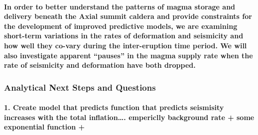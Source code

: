 \documentclass[11pt]{article}
\begin{document}
\hypertarget{in-order-to-better-understand-the-patterns-of-magma-storage-and-delivery-beneath-the-axial-summit-caldera-and-provide-constraints-for-the-development-of-improved-predictive-models-we-are-examining-short-term-variations-in-the-rates-of-deformation-and-seismicity-and-how-well-they-co-vary-during-the-inter-eruption-time-period.-we-will-also-investigate-apparent-pauses-in-the-magma-supply-rate-when-the-rate-of-seismicity-and-deformation-have-both-dropped.}{%
\paragraph{In order to better understand the patterns of magma storage
and delivery beneath the Axial summit caldera and provide constraints
for the development of improved predictive models, we are examining
short-term variations in the rates of deformation and seismicity and how
well they co-vary during the inter-eruption time period. We will also
investigate apparent ``pauses'' in the magma supply rate when the rate
of seismicity and deformation have both
dropped.}\label{in-order-to-better-understand-the-patterns-of-magma-storage-and-delivery-beneath-the-axial-summit-caldera-and-provide-constraints-for-the-development-of-improved-predictive-models-we-are-examining-short-term-variations-in-the-rates-of-deformation-and-seismicity-and-how-well-they-co-vary-during-the-inter-eruption-time-period.-we-will-also-investigate-apparent-pauses-in-the-magma-supply-rate-when-the-rate-of-seismicity-and-deformation-have-both-dropped.}}

\hypertarget{analytical-next-steps-and-questions}{%
\subsubsection{Analytical Next Steps and
Questions}\label{analytical-next-steps-and-questions}}

\hypertarget{create-model-that-predicts-function-that-predicts-seismisity-increases-with-the-total-inflation.-empericlly-background-rate-some-exponential-function}{%
\paragraph{1. Create model that predicts function that predicts
seismisity increases with the total inflation\ldots{}. empericlly
background rate + some exponential function
+}\label{create-model-that-predicts-function-that-predicts-seismisity-increases-with-the-total-inflation.-empericlly-background-rate-some-exponential-function}}
\end{document}
